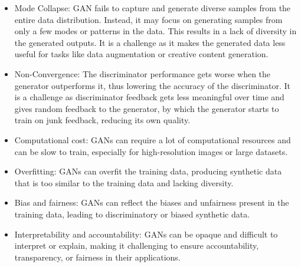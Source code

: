 \begin{itemize}
    \item Mode Collapse: GAN fails to capture and generate diverse samples from the entire data distribution. Instead, it may focus on generating samples from only a few modes or patterns in the data. This results in a lack of diversity in the generated outputs. It is a challenge as it makes the generated data less useful for tasks like data augmentation or creative content generation.
    \item Non-Convergence: The discriminator performance gets worse when the generator outperforms it, thus lowering the accuracy of the discriminator. It is a challenge as discriminator feedback gets less meaningful over time and gives random feedback to the generator, by which the generator starts to train on junk feedback, reducing its own quality.
    \item Computational cost: GANs can require a lot of computational resources and can be slow to train, especially for high-resolution images or large datasets.
    \item Overfitting: GANs can overfit the training data, producing synthetic data that is too similar to the training data and lacking diversity.
    \item Bias and fairness: GANs can reflect the biases and unfairness present in the training data, leading to discriminatory or biased synthetic data.
    \item Interpretability and accountability: GANs can be opaque and difficult to interpret or explain, making it challenging to ensure accountability, transparency, or fairness in their applications.
\end{itemize}